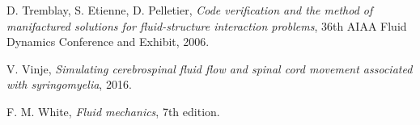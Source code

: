 \documentclass[a4paper,11pt,openright,twoside]{book}
\begin{document}
\begin{thebibliography}{100}
 D. Tremblay, S. Etienne, D. Pelletier, \emph{Code verification and the method of manifactured solutions for fluid-structure interaction problems}, 36th AIAA Fluid Dynamics Conference and Exhibit, 2006.

 V. Vinje, \emph{Simulating cerebrospinal fluid flow and spinal cord movement associated with syringomyelia}, 2016.

 F. M. White, \emph{Fluid mechanics}, 7th edition.


\end{thebibliography}
\end{document}
